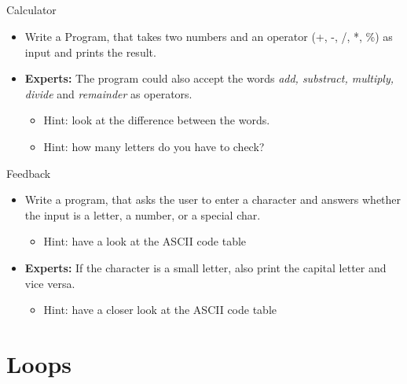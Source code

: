 \subsection{}
\begin{frame}{Calculator}
	\begin{itemize}
		\item Write a Program, that takes two numbers and an operator (+, -, /, *, \%) as input and prints the result.
		\item \textbf{Experts:} The program could also accept the words \textit{add, substract, multiply, divide} and \textit{remainder} as operators.
		\begin{itemize}
			\item<2-> Hint: look at the difference between the words.
			\item<3-> Hint: how many letters do you have to check?
		\end{itemize}
	\end{itemize}
\end{frame}
\begin{frame}{Feedback}
	\begin{itemize}
		\item Write a program, that asks the user to enter a character and answers whether the input is a letter, a number, or a special char.
		\begin{itemize}
			\item<2-> Hint: have a look at the ASCII code table
		\end{itemize}
		\item \textbf{Experts:} If the character is a small letter, also print the capital letter and vice versa.
		\begin{itemize}
			\item<3-> Hint: have a closer look at the ASCII code table
		\end{itemize}
	\end{itemize}
\end{frame}
\section{Loops}
